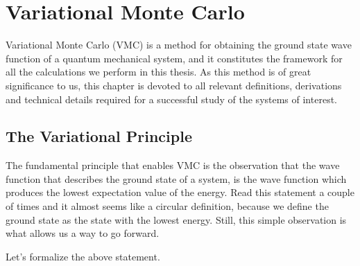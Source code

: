\documentclass[Thesis.tex]{subfiles}
\begin{document}
\chapter{Variational Monte Carlo}
\label{chp:variational-monte-carlo}

Variational Monte Carlo (VMC) is a method for obtaining the ground state wave function of
a quantum mechanical system, and it constitutes the framework for all the calculations we
perform in this thesis. As this method is of great significance to us, this chapter is
devoted to all relevant definitions, derivations and technical details required for a
successful study of the systems of interest.


\section{The Variational Principle}

The fundamental principle that enables VMC is the observation that the wave function that
describes the ground state of a system, is the wave function which produces the lowest
expectation value of the energy. Read this statement a couple of times and it almost seems
like a circular definition, because we define the ground state as the state with the
lowest energy. Still, this simple observation is what allows us a way to go forward.

Let's formalize the above statement.
\end{document}
